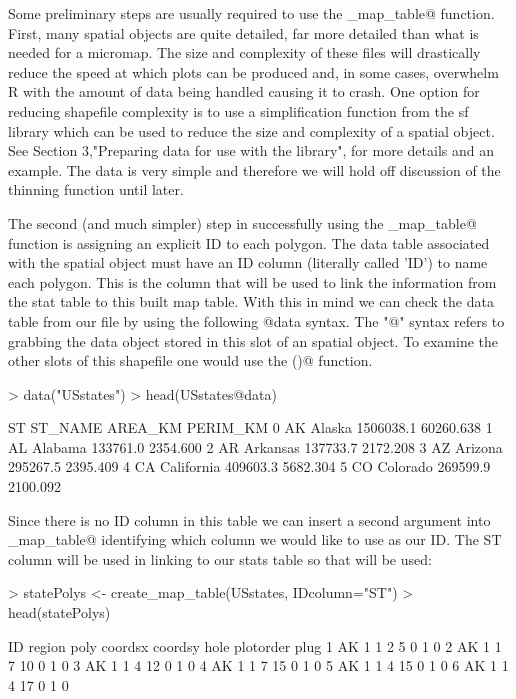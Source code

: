 \documentclass{article}
\newcommand{\R}{{\normalfont\textsf{R }}{}}
\begin{document}
Some preliminary steps are usually required to use the \verb@create_map_table@ function. First, many spatial objects are quite detailed, far more detailed than what is needed for a micromap. The size and complexity of these files will drastically reduce the speed at which plots can be produced and, in some cases, overwhelm \R with the amount of data being handled causing it to crash. One option for reducing shapefile complexity is to use a simplification function from the sf library which can be used to reduce the size and complexity of a spatial object.  See Section 3,"Preparing data for use with the library", for more details and an example.  The \verb@USstates@ data is very simple and therefore we will hold off discussion of the thinning function until later.

The second (and much simpler) step in successfully using the \verb@create_map_table@ function is assigning an explicit ID to each polygon. The data table associated with the spatial object must have an ID column (literally called 'ID') to name each polygon. This is the column that will be used to link the information from the stat table to this built map table. With this in mind we can check the data table from our \verb@USstates@ file by using the following @data syntax. The "@" syntax refers to grabbing the data object stored in this slot of an \verb@sp@ spatial object. To examine the other slots of this shapefile one would use the \verb@slotNames()@ function.

\begin{Schunk}
\begin{Sinput}
> data("USstates") 
> head(USstates@data)
\end{Sinput}
\begin{Soutput}
  ST    ST_NAME   AREA_KM  PERIM_KM
0 AK     Alaska 1506038.1 60260.638
1 AL    Alabama  133761.0  2354.600
2 AR   Arkansas  137733.7  2172.208
3 AZ    Arizona  295267.5  2395.409
4 CA California  409603.3  5682.304
5 CO   Colorado  269599.9  2100.092
\end{Soutput}
\end{Schunk}

Since there is no ID column in this table we can insert a second argument into \verb@create_map_table@ identifying which column we would like to use as our ID. The ST column will be used in linking to our stats table so that will be used:

\begin{Schunk}
\begin{Sinput}
> statePolys <- create_map_table(USstates, IDcolumn="ST") 
> head(statePolys) 
\end{Sinput}
\begin{Soutput}
  ID region poly coordsx coordsy hole plotorder plug
1 AK      1    1       2       5    0         1    0
2 AK      1    1       7      10    0         1    0
3 AK      1    1       4      12    0         1    0
4 AK      1    1       7      15    0         1    0
5 AK      1    1       4      15    0         1    0
6 AK      1    1       4      17    0         1    0
\end{Soutput}
\end{Schunk}
\end{document}
